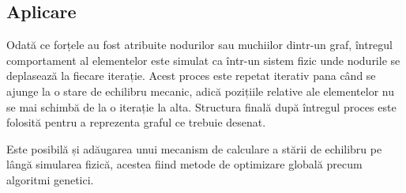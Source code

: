 \subsection{Aplicare}

Odată ce forțele au fost atribuite nodurilor sau muchiilor dintr-un graf, întregul comportament al elementelor 
este simulat ca într-un sistem fizic unde nodurile se deplasează la fiecare iterație. Acest proces este repetat 
iterativ pana când se ajunge la o stare de echilibru mecanic, adică pozițiile relative ale elementelor nu se mai 
schimbă de la o iterație la alta. Structura finală după întregul proces este folosită pentru a reprezenta graful ce 
trebuie desenat.\newline

Este posibilă și adăugarea unui mecanism de calculare a stării de echilibru pe lângă simularea fizică, acestea fiind 
metode de optimizare globală precum algoritmi genetici.\newline

